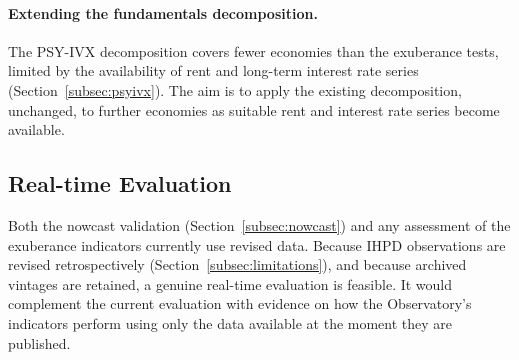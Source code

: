 \paragraph{Extending the fundamentals decomposition.}
The PSY-IVX decomposition covers fewer economies than the exuberance tests,
limited by the availability of rent and long-term interest rate series
(Section~\ref{subsec:psyivx}). The aim is to apply the existing
decomposition, unchanged, to further economies as suitable rent and interest
rate series become available.

\subsection{Real-time Evaluation}

Both the nowcast validation (Section~\ref{subsec:nowcast}) and any assessment
of the exuberance indicators currently use revised data. Because IHPD
observations are revised retrospectively
(Section~\ref{subsec:limitations}), and because archived vintages are
retained, a genuine real-time evaluation is
feasible. It would complement the current evaluation with evidence on how the
Observatory's indicators perform using only the data available at the moment
they are published.
